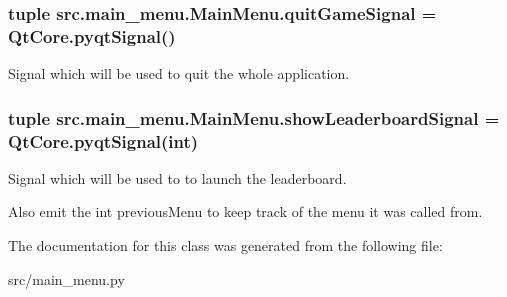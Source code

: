 \hypertarget{classsrc_1_1main__menu_1_1_main_menu_adb966ecda1f332af67efc3c3b3adf8bd}{}
\subsubsection[{quit\+Game\+Signal}]{\setlength{\rightskip}{0pt plus 5cm}tuple src.\+main\+\_\+menu.\+Main\+Menu.\+quit\+Game\+Signal = Qt\+Core.\+pyqt\+Signal()\hspace{0.3cm}{\ttfamily [static]}}\label{classsrc_1_1main__menu_1_1_main_menu_adb966ecda1f332af67efc3c3b3adf8bd}


Signal which will be used to quit the whole application. 

\hypertarget{classsrc_1_1main__menu_1_1_main_menu_aa737b525a5e965eb6af321d25baa787c}{}
\subsubsection[{show\+Leaderboard\+Signal}]{\setlength{\rightskip}{0pt plus 5cm}tuple src.\+main\+\_\+menu.\+Main\+Menu.\+show\+Leaderboard\+Signal = Qt\+Core.\+pyqt\+Signal(int)\hspace{0.3cm}{\ttfamily [static]}}\label{classsrc_1_1main__menu_1_1_main_menu_aa737b525a5e965eb6af321d25baa787c}


Signal which will be used to to launch the leaderboard. 

Also emit the int \textquotesingle{}previous\+Menu\textquotesingle{} to keep track of the menu it was called from. 

The documentation for this class was generated from the following file\+:\begin{DoxyCompactItemize}
\item 
src/main\+\_\+menu.\+py\end{DoxyCompactItemize}
